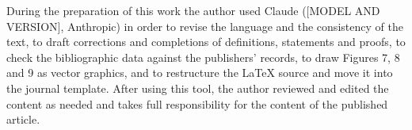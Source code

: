 %

During the preparation of this work the author used Claude ([MODEL AND VERSION], Anthropic) in order to revise the language and the consistency of the text, to draft corrections and completions of definitions, statements and proofs, to check the bibliographic data against the publishers' records, to draw Figures 7, 8 and 9 as vector graphics, and to restructure the LaTeX source and move it into the journal template.
After using this tool, the author reviewed and edited the content as needed and takes full responsibility for the content of the published article.
